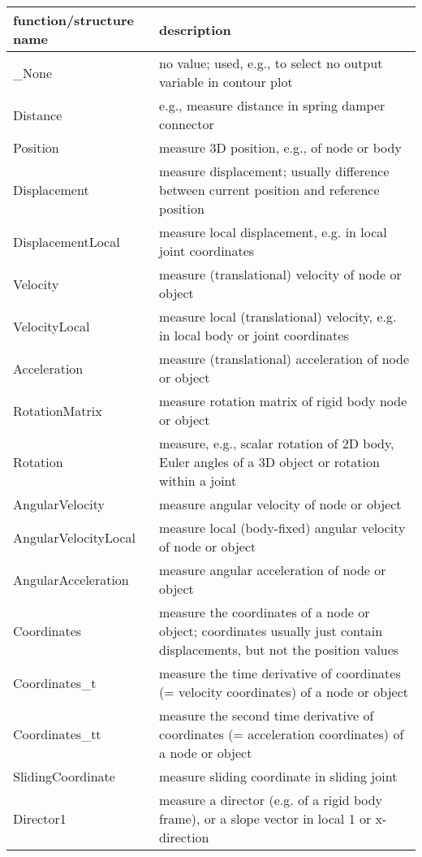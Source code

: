 \begin{center}
\footnotesize
\begin{longtable}{| p{8cm} | p{8cm} |} 
\hline
{\bf function/structure name} & {\bf description}\\ \hline
  \_None & no value; used, e.g., to select no output variable in contour plot\\ \hline 
  Distance & e.g., measure distance in spring damper connector\\ \hline 
  Position & measure 3D position, e.g., of node or body\\ \hline 
  Displacement & measure displacement; usually difference between current position and reference position\\ \hline 
  DisplacementLocal & measure local displacement, e.g. in local joint coordinates\\ \hline 
  Velocity & measure (translational) velocity of node or object\\ \hline 
  VelocityLocal & measure local (translational) velocity, e.g. in local body or joint coordinates\\ \hline 
  Acceleration & measure (translational) acceleration of node or object\\ \hline 
  RotationMatrix & measure rotation matrix of rigid body node or object\\ \hline 
  Rotation & measure, e.g., scalar rotation of 2D body, Euler angles of a 3D object or rotation within a joint\\ \hline 
  AngularVelocity & measure angular velocity of node or object\\ \hline 
  AngularVelocityLocal & measure local (body-fixed) angular velocity of node or object\\ \hline 
  AngularAcceleration & measure angular acceleration of node or object\\ \hline 
  Coordinates & measure the coordinates of a node or object; coordinates usually just contain displacements, but not the position values\\ \hline 
  Coordinates\_t & measure the time derivative of coordinates (= velocity coordinates) of a node or object\\ \hline 
  Coordinates\_tt & measure the second time derivative of coordinates (= acceleration coordinates) of a node or object\\ \hline 
  SlidingCoordinate & measure sliding coordinate in sliding joint\\ \hline 
  Director1 & measure a director (e.g. of a rigid body frame), or a slope vector in local 1 or x-direction\\ \hline 

\end{longtable}
\end{center}
